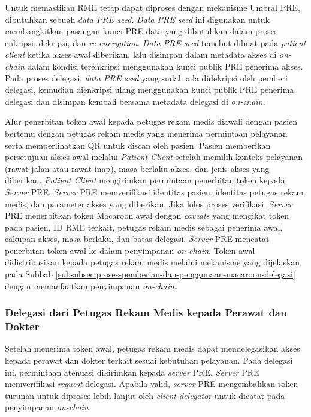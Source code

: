 Untuk memastikan RME tetap dapat diproses dengan mekanisme Umbral PRE, dibutuhkan sebuah \textit{data PRE seed}. \textit{Data PRE seed} ini digunakan untuk membangkitkan pasangan kunci PRE data yang dibutuhkan dalam proses enkripsi, dekripsi, dan \textit{re-encryption}. \textit{Data PRE seed} tersebut dibuat pada \textit{patient client} ketika akses awal diberikan, lalu disimpan dalam metadata akses di \textit{on-chain} dalam kondisi terenkripsi menggunakan kunci publik PRE penerima akses. Pada proses delegasi, \textit{data PRE seed} yang sudah ada didekripsi oleh pemberi delegasi, kemudian dienkripsi ulang menggunakan kunci publik PRE penerima delegasi dan disimpan kembali bersama metadata delegasi di \textit{on-chain}.

Alur penerbitan token awal kepada petugas rekam medis diawali dengan pasien bertemu dengan petugas rekam medis yang menerima permintaan pelayanan serta memperlihatkan QR untuk discan oleh pasien. Pasien memberikan persetujuan akses awal melalui \textit{Patient Client} setelah memilih konteks pelayanan (rawat jalan atau rawat inap), masa berlaku akses, dan jenis akses yang diberikan. \textit{Patient Client} mengirimkan permintaan penerbitan token kepada \textit{Server} PRE. \textit{Server} PRE memverifikasi identitas pasien, identitas petugas rekam medis, dan parameter akses yang diberikan. Jika lolos proses verifikasi, \textit{Server} PRE menerbitkan token Macaroon awal dengan \textit{caveats} yang mengikat token pada pasien, ID RME terkait, petugas rekam medis sebagai penerima awal, cakupan akses, masa berlaku, dan batas delegasi. \textit{Server} PRE mencatat penerbitan token awal ke dalam penyimpanan \textit{on-chain}. Token awal didistribusikan kepada petugas rekam medis melalui mekanisme yang dijelaskan pada Subbab \ref{subsubsec:proses-pemberian-dan-penggunaan-macaroon-delegasi} dengan memanfaatkan penyimpanan \textit{on-chain}.

\subsubsection{Delegasi dari Petugas Rekam Medis kepada Perawat dan Dokter}
\label{subsec:delegasi-dari-petugas-rekam-medis-kepada-perawat-dan-dokter}

Setelah menerima token awal, petugas rekam medis dapat mendelegasikan akses kepada perawat dan dokter terkait sesuai kebutuhan pelayanan. Pada delegasi ini, permintaan atenuasi dikirimkan kepada \textit{server} PRE. \textit{Server} PRE memverifikasi \textit{request} delegasi. Apabila valid, \textit{server} PRE mengembalikan token turunan untuk diproses lebih lanjut oleh \textit{client delegator} untuk dicatat pada penyimpanan \textit{on-chain}.

